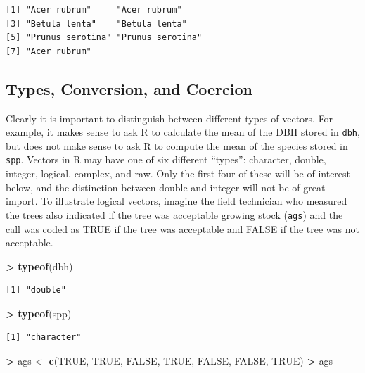 \documentclass[]{krantz}
\makeatletter
\newenvironment{Shaded}{\begin{snugshade}}{\end{snugshade}}
\newcommand{\KeywordTok}[1]{\textcolor[rgb]{0.27,0.27,0.27}{\textbf{#1}}}
\newcommand{\StringTok}[1]{\textcolor[rgb]{0.5,0.5,0.5}{#1}}
\newcommand{\OtherTok}[1]{\textcolor[rgb]{0.37,0.37,0.37}{#1}}
\newcommand{\OperatorTok}[1]{\textcolor[rgb]{0.43,0.43,0.43}{\textbf{#1}}}
\newcommand{\NormalTok}[1]{#1}
\newenvironment{kframe}{%
\medskip{}
\setlength{\fboxsep}{.8em}
 \def\at@end@of@kframe{}%
 \ifinner\ifhmode%
  \def\at@end@of@kframe{\end{minipage}}%
  \begin{minipage}{\columnwidth}%
 \fi\fi%
 \def\FrameCommand##1{\hskip\@totalleftmargin \hskip-\fboxsep
 \colorbox{shadecolor}{##1}\hskip-\fboxsep
     \hskip-\linewidth \hskip-\@totalleftmargin \hskip\columnwidth}%
 \MakeFramed {\advance\hsize-\width
   \@totalleftmargin\z@ \linewidth\hsize
   \@setminipage}}%
 {\par\unskip\endMakeFramed%
 \at@end@of@kframe}
\renewenvironment{Shaded}{\begin{kframe}}{\end{kframe}}
\theoremstyle{definition}
\theoremstyle{definition}
\theoremstyle{definition}
\theoremstyle{remark}
\makeatother
\begin{document}
\begin{verbatim}
[1] "Acer rubrum"     "Acer rubrum"    
[3] "Betula lenta"    "Betula lenta"   
[5] "Prunus serotina" "Prunus serotina"
[7] "Acer rubrum"    
\end{verbatim}

\subsection{Types, Conversion, and
Coercion}\label{types-conversion-and-coercion}

Clearly it is important to distinguish between different types of
vectors. For example, it makes sense to ask R to calculate the mean of
the DBH stored in \texttt{dbh}, but does not make sense to ask R to
compute the mean of the species stored in \texttt{spp}. Vectors in R may
have one of six different ``types'': character, double, integer,
logical, complex, and raw. Only the first four of these will be of
interest below, and the distinction between double and integer will not
be of great import. To illustrate logical vectors, imagine the field
technician who measured the trees also indicated if the tree was
acceptable growing stock (\texttt{ags}) and the call was coded as TRUE
if the tree was acceptable and FALSE if the tree was not acceptable.

\begin{Shaded}
\begin{Highlighting}[]
\OperatorTok{>}\StringTok{ }\KeywordTok{typeof}\NormalTok{(dbh)}
\end{Highlighting}
\end{Shaded}

\begin{verbatim}
[1] "double"
\end{verbatim}

\begin{Shaded}
\begin{Highlighting}[]
\OperatorTok{>}\StringTok{ }\KeywordTok{typeof}\NormalTok{(spp)}
\end{Highlighting}
\end{Shaded}

\begin{verbatim}
[1] "character"
\end{verbatim}

\begin{Shaded}
\begin{Highlighting}[]
\OperatorTok{>}\StringTok{ }\NormalTok{ags <-}\StringTok{ }\KeywordTok{c}\NormalTok{(}\OtherTok{TRUE}\NormalTok{, }\OtherTok{TRUE}\NormalTok{, }\OtherTok{FALSE}\NormalTok{, }\OtherTok{TRUE}\NormalTok{, }\OtherTok{FALSE}\NormalTok{, }\OtherTok{FALSE}\NormalTok{, }\OtherTok{TRUE}\NormalTok{)}
\OperatorTok{>}\StringTok{ }\NormalTok{ags}
\end{Highlighting}
\end{Shaded}
\end{document}
